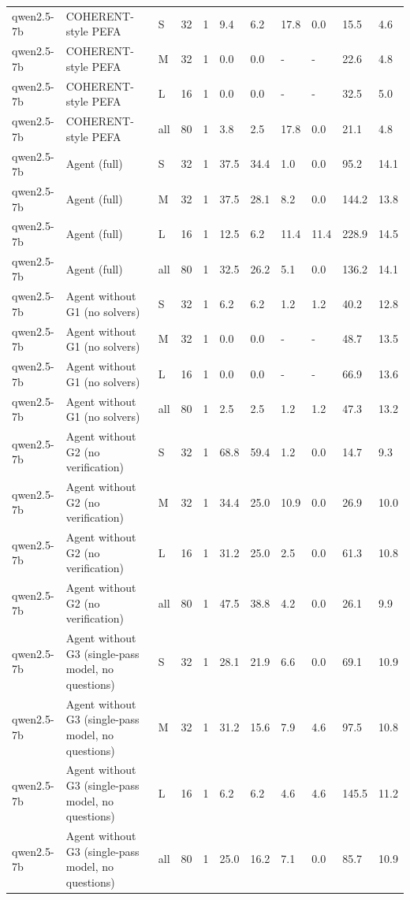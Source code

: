 \begin{tabular}{lllllllllll}
qwen2.5-7b & COHERENT-style PEFA & S & 32 & 1 & 9.4 & 6.2 & 17.8 & 0.0 & 15.5 & 4.6 \\
qwen2.5-7b & COHERENT-style PEFA & M & 32 & 1 & 0.0 & 0.0 & - & - & 22.6 & 4.8 \\
qwen2.5-7b & COHERENT-style PEFA & L & 16 & 1 & 0.0 & 0.0 & - & - & 32.5 & 5.0 \\
qwen2.5-7b & COHERENT-style PEFA & all & 80 & 1 & 3.8 & 2.5 & 17.8 & 0.0 & 21.1 & 4.8 \\
qwen2.5-7b & Agent (full) & S & 32 & 1 & 37.5 & 34.4 & 1.0 & 0.0 & 95.2 & 14.1 \\
qwen2.5-7b & Agent (full) & M & 32 & 1 & 37.5 & 28.1 & 8.2 & 0.0 & 144.2 & 13.8 \\
qwen2.5-7b & Agent (full) & L & 16 & 1 & 12.5 & 6.2 & 11.4 & 11.4 & 228.9 & 14.5 \\
qwen2.5-7b & Agent (full) & all & 80 & 1 & 32.5 & 26.2 & 5.1 & 0.0 & 136.2 & 14.1 \\
qwen2.5-7b & Agent without G1 (no solvers) & S & 32 & 1 & 6.2 & 6.2 & 1.2 & 1.2 & 40.2 & 12.8 \\
qwen2.5-7b & Agent without G1 (no solvers) & M & 32 & 1 & 0.0 & 0.0 & - & - & 48.7 & 13.5 \\
qwen2.5-7b & Agent without G1 (no solvers) & L & 16 & 1 & 0.0 & 0.0 & - & - & 66.9 & 13.6 \\
qwen2.5-7b & Agent without G1 (no solvers) & all & 80 & 1 & 2.5 & 2.5 & 1.2 & 1.2 & 47.3 & 13.2 \\
qwen2.5-7b & Agent without G2 (no verification) & S & 32 & 1 & 68.8 & 59.4 & 1.2 & 0.0 & 14.7 & 9.3 \\
qwen2.5-7b & Agent without G2 (no verification) & M & 32 & 1 & 34.4 & 25.0 & 10.9 & 0.0 & 26.9 & 10.0 \\
qwen2.5-7b & Agent without G2 (no verification) & L & 16 & 1 & 31.2 & 25.0 & 2.5 & 0.0 & 61.3 & 10.8 \\
qwen2.5-7b & Agent without G2 (no verification) & all & 80 & 1 & 47.5 & 38.8 & 4.2 & 0.0 & 26.1 & 9.9 \\
qwen2.5-7b & Agent without G3 (single-pass model, no questions) & S & 32 & 1 & 28.1 & 21.9 & 6.6 & 0.0 & 69.1 & 10.9 \\
qwen2.5-7b & Agent without G3 (single-pass model, no questions) & M & 32 & 1 & 31.2 & 15.6 & 7.9 & 4.6 & 97.5 & 10.8 \\
qwen2.5-7b & Agent without G3 (single-pass model, no questions) & L & 16 & 1 & 6.2 & 6.2 & 4.6 & 4.6 & 145.5 & 11.2 \\
qwen2.5-7b & Agent without G3 (single-pass model, no questions) & all & 80 & 1 & 25.0 & 16.2 & 7.1 & 0.0 & 85.7 & 10.9 \\
\bottomrule
\end{tabular}
